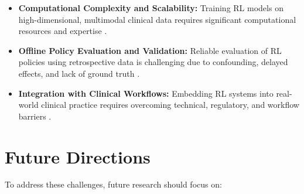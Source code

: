 \begin{itemize}
    \item \textbf{Computational Complexity and Scalability:} Training RL models on high-dimensional, multimodal clinical data requires significant computational resources and expertise \cite{DOI105425427552721, hassouniClusteringbasedReinforcementLearning2020, gorrepatiReinforcementLearningFramework2025, yangDeepReinforcementLearning2024}.
    \item \textbf{Offline Policy Evaluation and Validation:} Reliable evaluation of RL policies using retrospective data is challenging due to confounding, delayed effects, and lack of ground truth \cite{luoReinforcementLearningDynamic2024, killianEmpiricalStudyRepresentation2020, zhengPersonalizedMultimorbidityManagement2021, zadehOptimizingWarfarinDosing2023}.
    \item \textbf{Integration with Clinical Workflows:} Embedding RL systems into real-world clinical practice requires overcoming technical, regulatory, and workflow barriers \cite{barataReinforcementLearningModel2023, ohEffectiveDatadrivenPrecision2022, gorrepatiReinforcementLearningFramework2025, banumathiReinforcementLearningPersonalized2025}.
\end{itemize}

\section{Future Directions}

To address these challenges, future research should focus on:

